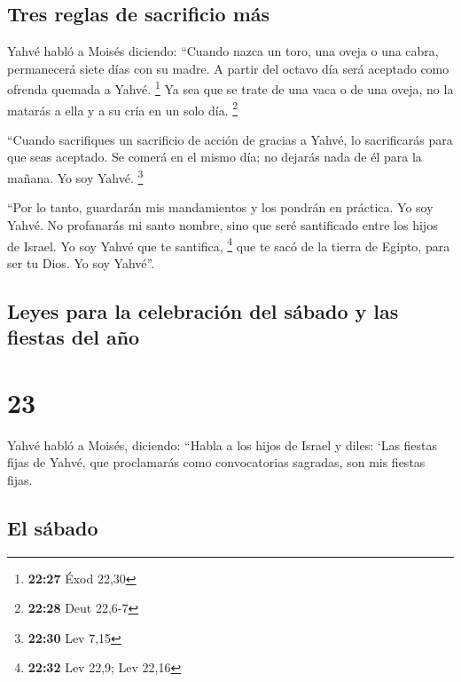 \hypertarget{tres-reglas-de-sacrificio-muxe1s}{%
\subsection{Tres reglas de sacrificio
más}\label{tres-reglas-de-sacrificio-muxe1s}}

 Yahvé habló a Moisés diciendo:  ``Cuando
nazca un toro, una oveja o una cabra, permanecerá siete días con su
madre. A partir del octavo día será aceptado como ofrenda quemada a
Yahvé. \footnote{\textbf{22:27} Éxod 22,30}  Ya sea que
se trate de una vaca o de una oveja, no la matarás a ella y a su cría en
un solo día. \footnote{\textbf{22:28} Deut 22,6-7}

 ``Cuando sacrifiques un sacrificio de acción de gracias
a Yahvé, lo sacrificarás para que seas aceptado.  Se
comerá en el mismo día; no dejarás nada de él para la mañana. Yo soy
Yahvé. \footnote{\textbf{22:30} Lev 7,15}

 ``Por lo tanto, guardarán mis mandamientos y los pondrán
en práctica. Yo soy Yahvé.  No profanarás mi santo
nombre, sino que seré santificado entre los hijos de Israel. Yo soy
Yahvé que te santifica, \footnote{\textbf{22:32} Lev 22,9; Lev 22,16}
 que te sacó de la tierra de Egipto, para ser tu Dios. Yo
soy Yahvé''.

\hypertarget{leyes-para-la-celebraciuxf3n-del-suxe1bado-y-las-fiestas-del-auxf1o}{%
\subsection{Leyes para la celebración del sábado y las fiestas del
año}\label{leyes-para-la-celebraciuxf3n-del-suxe1bado-y-las-fiestas-del-auxf1o}}

\hypertarget{section-22}{%
\section{23}\label{section-22}}

 Yahvé habló a Moisés, diciendo:  ``Habla a
los hijos de Israel y diles: `Las fiestas fijas de Yahvé, que
proclamarás como convocatorias sagradas, son mis fiestas fijas.

\hypertarget{el-suxe1bado}{%
\subsection{El sábado}\label{el-suxe1bado}}

